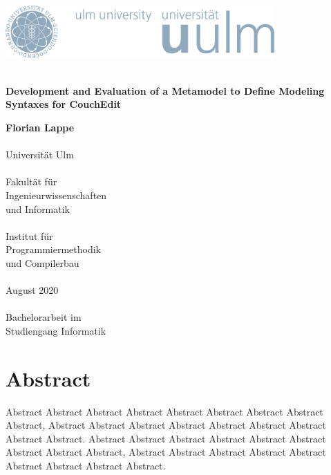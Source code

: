 \documentclass[a4paper,10pt
headsepline,           %
doubleside,            %
pointlessnumbers,      %
bibliography=totoc,              %
BCOR15mm,               %
leqno					%
]{scrbook}
\newcommand{\fullname}{Florian Lappe}
\newcommand{\titel}{}
\newcommand{\untertitel}{Development and Evaluation of a Metamodel to Define Modeling Syntaxes for CouchEdit}
\newcommand{\abgabedatum}{August 2020}
\newcommand{\abschlussarbeit}{Bachelorarbeit}
\begin{document}
\frontmatter %


\begin{titlepage}
	\selectfont %
	\hfill\includegraphics[height=2.0cm]{images/logo_100_sRGB}\\[3.5cm] %
	\begin{flushright}
		\Huge \textbf{\titel}\\[0.2cm]
		\fontsize{19}{20}\selectfont \textbf{\untertitel}\\
	\end{flushright}
	
	\vfill\hfill
	\parbox[t]{4.6cm}{
		\singlespacing
		\large
		\textbf{\fullname}\\
		\\
		Universität Ulm\\
		\\
		Fakultät für\\
		Ingenieurwissenschaften\\
		und Informatik\\
		\\
		Institut für\\
		Programmiermethodik\\
		und Compilerbau\\
		\\
		\abgabedatum\\
		\\
		{\abschlussarbeit} im\\
		Studiengang Informatik
	}
\end{titlepage}
\restoregeometry


\clearpage
\thispagestyle{empty}
\chapter*{Abstract}

Abstract Abstract Abstract Abstract Abstract Abstract Abstract Abstract Abstract,
Abstract Abstract Abstract Abstract Abstract Abstract Abstract Abstract Abstract.
Abstract Abstract Abstract Abstract Abstract Abstract Abstract Abstract Abstract,
Abstract Abstract Abstract Abstract Abstract Abstract Abstract Abstract Abstract.
\end{document}

